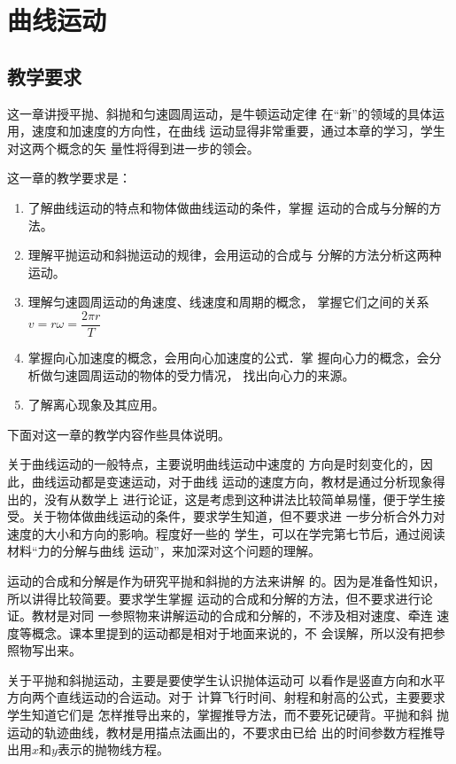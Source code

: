 
\chapter{曲线运动}\minitoc[n]
\section{教学要求}
这一章讲授平抛、斜抛和匀速圆周运动，是牛顿运动定律
在“新”的领域的具体运用，速度和加速度的方向性，在曲线
运动显得非常重要，通过本章的学习，学生对这两个概念的矢
量性将得到进一步的领会。

这一章的教学要求是：
\begin{enumerate}
\item 了解曲线运动的特点和物体做曲线运动的条件，掌握
运动的合成与分解的方法。
\item 理解平抛运动和斜抛运动的规律，会用运动的合成与
分解的方法分析这两种运动。
\item 理解匀速圆周运动的角速度、线速度和周期的概念，
掌握它们之间的关系$v=r\omega=\dfrac{2\pi r}{T}$
\item 掌握向心加速度的概念，会用向心加速度的公式．掌
握向心力的概念，会分析做匀速圆周运动的物体的受力情况，
找出向心力的来源。
\item 了解离心现象及其应用。
\end{enumerate}

下面对这一章的教学内容作些具体说明。

关于曲线运动的一般特点，主要说明曲线运动中速度的
方向是时刻变化的，因此，曲线运动都是变速运动，对于曲线
运动的速度方向，教材是通过分析现象得出的，没有从数学上
进行论证，这是考虑到这种讲法比较简单易懂，便于学生接
受。关于物体做曲线运动的条件，要求学生知道，但不要求进
一步分析合外力对速度的大小和方向的影响。程度好一些的
学生，可以在学完第七节后，通过阅读材料“力的分解与曲线
运动”，来加深对这个问题的理解。

运动的合成和分解是作为研究平抛和斜抛的方法来讲解
的。因为是准备性知识，所以讲得比较简要。要求学生掌握
运动的合成和分解的方法，但不要求进行论证。教材是对同
一参照物来讲解运动的合成和分解的，不涉及相对速度、牵连
速度等概念。课本里提到的运动都是相对于地面来说的，不
会误解，所以没有把参照物写出来。

关于平抛和斜抛运动，主要是要使学生认识抛体运动可
以看作是竖直方向和水平方向两个直线运动的合运动。对于
计算飞行时间、射程和射高的公式，主要要求学生知道它们是
怎样推导出来的，掌握推导方法，而不要死记硬背。平抛和斜
抛运动的轨迹曲线，教材是用描点法画出的，不要求由已给
出的时间参数方程推导出用$x$和$y$表示的抛物线方程。

